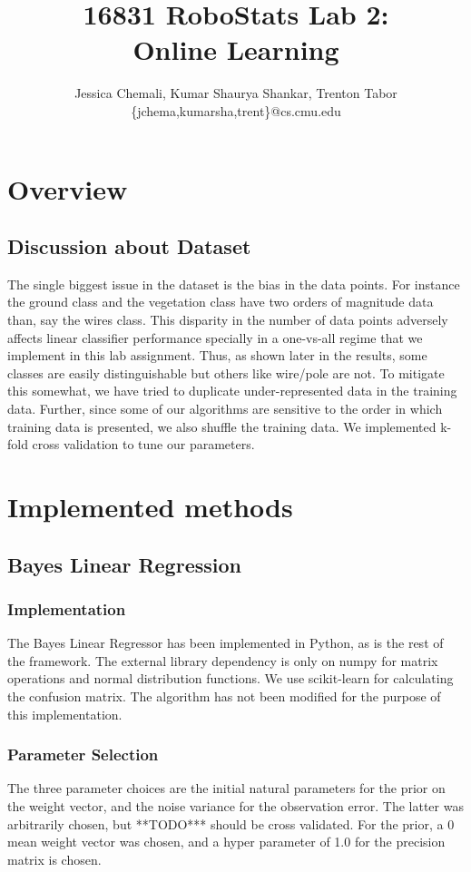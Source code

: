 \documentclass[10pt,a4paper]{article}
\author{Jessica Chemali, Kumar Shaurya Shankar, Trenton Tabor\\ \{jchema,kumarsha,trent\}@cs.cmu.edu}
\title{16831 RoboStats Lab 2: \\Online Learning}
\begin{document}
\maketitle
\section{Overview}
\subsection{Discussion about Dataset}
The single biggest issue in the dataset is the bias in the data points. For instance the ground class and the vegetation class have two orders of magnitude data than, say the wires class. This disparity in the number of data points adversely affects linear classifier performance specially in a one-vs-all regime that we implement in this lab assignment. Thus, as shown later in the results, some classes are easily distinguishable but others like wire/pole are not. To mitigate this somewhat, we have tried to duplicate under-represented data in the training data. Further, since some of our algorithms are sensitive to the order in which training data is presented, we also shuffle the training data. We implemented k-fold cross validation to tune our parameters.
\section{Implemented methods}
\subsection{Bayes Linear Regression}
\subsubsection{Implementation}
The Bayes Linear Regressor has been implemented in Python, as is the rest of the framework. The external library dependency is only on numpy for matrix operations and normal distribution functions. We use scikit-learn for calculating the confusion matrix. The algorithm has not been modified for the purpose of this implementation.
\subsubsection{Parameter Selection}
The three parameter choices are the initial natural parameters for the prior on the weight vector, and the noise variance for the observation error. The latter was arbitrarily chosen, but {\color{blue}**TODO***} should be cross validated. For the prior, a 0 mean weight vector was chosen, and a hyper parameter of 1.0 for the precision matrix is chosen.
\end{document}
